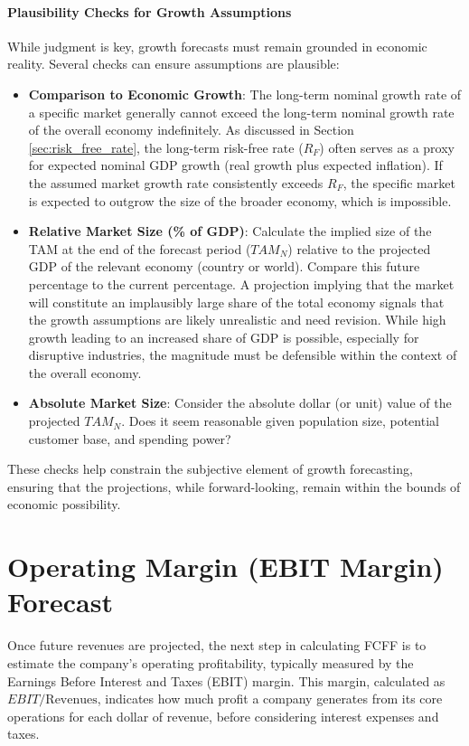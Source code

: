 \paragraph{Plausibility Checks for Growth Assumptions}
While judgment is key, growth forecasts must remain grounded in economic reality. Several checks can ensure assumptions are plausible:
\begin{itemize}
    \item \textbf{Comparison to Economic Growth}: The long-term nominal growth rate of a specific market generally cannot exceed the long-term nominal growth rate of the overall economy indefinitely. As discussed in Section \ref{sec:risk_free_rate}, the long-term risk-free rate (\(R_F\)) often serves as a proxy for expected nominal GDP growth (real growth plus expected inflation). If the assumed market growth rate consistently exceeds \(R_F\), the specific market is expected to outgrow the size of the broader economy, which is impossible.
    \item \textbf{Relative Market Size (\% of GDP)}: Calculate the implied size of the TAM at the end of the forecast period (\(TAM_N\)) relative to the projected GDP of the relevant economy (country or world). Compare this future percentage to the current percentage. A projection implying that the market will constitute an implausibly large share of the total economy signals that the growth assumptions are likely unrealistic and need revision. While high growth leading to an increased share of GDP is possible, especially for disruptive industries, the magnitude must be defensible within the context of the overall economy.
    \item \textbf{Absolute Market Size}: Consider the absolute dollar (or unit) value of the projected \(TAM_N\). Does it seem reasonable given population size, potential customer base, and spending power?
\end{itemize}

These checks help constrain the subjective element of growth forecasting, ensuring that the projections, while forward-looking, remain within the bounds of economic possibility.

\section{Operating Margin (EBIT Margin) Forecast} \label{sec:ebit_margin_forecast}
Once future revenues are projected, the next step in calculating FCFF is to estimate the company's operating profitability, typically measured by the Earnings Before Interest and Taxes (EBIT) margin. This margin, calculated as \(EBIT / \text{Revenues}\), indicates how much profit a company generates from its core operations for each dollar of revenue, before considering interest expenses and taxes.

